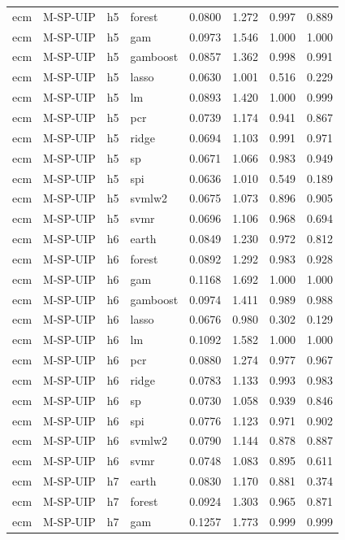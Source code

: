 \begin{ThreePartTable}
\begin{longtable}[t]{llclcccc}
ecm & M-SP-UIP & h5 & forest & 0.0800 & 1.272 & 0.997 & 0.889\\
ecm & M-SP-UIP & h5 & gam & 0.0973 & 1.546 & 1.000 & 1.000\\
ecm & M-SP-UIP & h5 & gamboost & 0.0857 & 1.362 & 0.998 & 0.991\\
ecm & M-SP-UIP & h5 & lasso & 0.0630 & 1.001 & 0.516 & 0.229\\
ecm & M-SP-UIP & h5 & lm & 0.0893 & 1.420 & 1.000 & 0.999\\
ecm & M-SP-UIP & h5 & pcr & 0.0739 & 1.174 & 0.941 & 0.867\\
ecm & M-SP-UIP & h5 & ridge & 0.0694 & 1.103 & 0.991 & 0.971\\
ecm & M-SP-UIP & h5 & sp & 0.0671 & 1.066 & 0.983 & 0.949\\
ecm & M-SP-UIP & h5 & spi & 0.0636 & 1.010 & 0.549 & 0.189\\
ecm & M-SP-UIP & h5 & svmlw2 & 0.0675 & 1.073 & 0.896 & 0.905\\
ecm & M-SP-UIP & h5 & svmr & 0.0696 & 1.106 & 0.968 & 0.694\\
\addlinespace
ecm & M-SP-UIP & h6 & earth & 0.0849 & 1.230 & 0.972 & 0.812\\
ecm & M-SP-UIP & h6 & forest & 0.0892 & 1.292 & 0.983 & 0.928\\
ecm & M-SP-UIP & h6 & gam & 0.1168 & 1.692 & 1.000 & 1.000\\
ecm & M-SP-UIP & h6 & gamboost & 0.0974 & 1.411 & 0.989 & 0.988\\
ecm & M-SP-UIP & h6 & lasso & 0.0676 & 0.980 & 0.302 & 0.129\\
ecm & M-SP-UIP & h6 & lm & 0.1092 & 1.582 & 1.000 & 1.000\\
ecm & M-SP-UIP & h6 & pcr & 0.0880 & 1.274 & 0.977 & 0.967\\
ecm & M-SP-UIP & h6 & ridge & 0.0783 & 1.133 & 0.993 & 0.983\\
ecm & M-SP-UIP & h6 & sp & 0.0730 & 1.058 & 0.939 & 0.846\\
ecm & M-SP-UIP & h6 & spi & 0.0776 & 1.123 & 0.971 & 0.902\\
ecm & M-SP-UIP & h6 & svmlw2 & 0.0790 & 1.144 & 0.878 & 0.887\\
ecm & M-SP-UIP & h6 & svmr & 0.0748 & 1.083 & 0.895 & 0.611\\
\addlinespace
ecm & M-SP-UIP & h7 & earth & 0.0830 & 1.170 & 0.881 & 0.374\\
ecm & M-SP-UIP & h7 & forest & 0.0924 & 1.303 & 0.965 & 0.871\\
ecm & M-SP-UIP & h7 & gam & 0.1257 & 1.773 & 0.999 & 0.999\\

\end{longtable}
\end{ThreePartTable}
